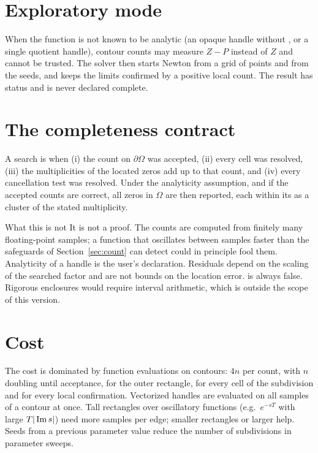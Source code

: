 \section{Exploratory mode}\label{sec:exploratory}

When the function is not known to be analytic (an opaque handle without
, or a single quotient handle), contour counts may
measure $Z-P$ instead of $Z$ and cannot be trusted. The solver then starts
Newton from a  grid of points and from the seeds, and keeps
the limits confirmed by a positive local count. The result has status
 and is never declared complete.

\section{The completeness contract}\label{sec:contract}

A search is  when (i) the count on
$\partial\Omega$ was accepted, (ii) every cell was resolved, (iii) the
multiplicities of the located zeros add up to that count, and (iv) every
cancellation test was resolved. Under the analyticity assumption, and if
the accepted counts are correct, all zeros in $\Omega$ are then reported,
each within its  as a cluster of the stated
multiplicity.

\begin{keybox}{What this is not}
It is not a proof. The counts are computed from finitely many floating-point
samples; a function that oscillates between samples faster than the
safeguards of Section~\ref{sec:count} can detect could in principle fool
them. Analyticity of a handle is the user's declaration. Residuals depend on
the scaling of the searched factor and are not bounds on the location
error.  is always false. Rigorous enclosures would
require interval arithmetic, which is outside the scope of this version.
\end{keybox}

\section{Cost}

The cost is dominated by function evaluations on contours: $4n$ per count,
with $n$ doubling until acceptance, for the outer rectangle, for every
cell of the subdivision and for every local confirmation. Vectorized
handles are evaluated on all samples of a contour at once. Tall rectangles
over oscillatory functions (e.g.\ $e^{-sT}$ with large $T|\operatorname{Im} s|$) need
more samples per edge; smaller rectangles or larger
 help. Seeds from a previous parameter value
reduce the number of subdivisions in parameter sweeps.


